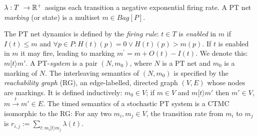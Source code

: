 $\lambda : T \ \rightarrow \mathbb{R}^+$ assigns each transition a negative exponential firing rate. 
A PT net \emph{marking} (or state) is a multiset $m \in Bag[P]$.

The PT net dynamics
is defined by the \emph{firing rule}:
$t\in T$ is \emph{enabled} in $m$ if  
$I(t) \leq m$ and $\forall p \in P:  H(t)(p) = 0 \vee H(t)(p) > m(p)$. 
If $t$ is enabled in $m$ it may fire, leading to marking $m^\prime = m + O(t) - I(t)$.
We denote this: $m [ t \rangle m'$.
A PT-\emph{system} is a pair $(N,m_0)$, where $N$ is a PT net and $m_0$ is a marking of $N$.
The interleaving semantics of $(N,m_0)$ is specified by the \emph{reachability graph} (RG), an edge-labelled, directed graph $(V, E)$  whose nodes are markings. It is defined inductively: $m_0 \in V$; if $m \in V$ and
$m [ t\rangle m'$
then $m' \in V$, $m \xrightarrow{t} m' \in E$.
The timed semantics of a stochastic PT system is a CTMC isomorphic to the RG:
For any two $m_i, m_j \in V$, the transition rate from $m_i$ to $m_j$ is $r_{i,j} := \sum_{t : m_i [ t \rangle m_j} \lambda(t)$.



